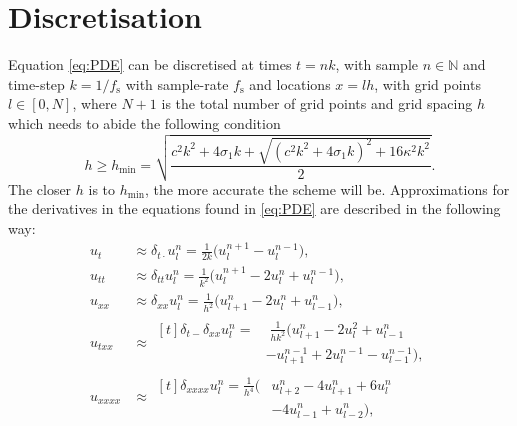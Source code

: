 \documentclass[twoside,a4paper]{article}
\begin{document}
\section{Discretisation}\label{sec:discretisation}
Equation \eqref{eq:PDE} can be discretised at times $t = nk$, with sample $n \in \mathbb{N}$ and time-step $k = 1 / f_\text{s}$ with sample-rate $f_\text{s}$ and locations $x = lh$, with grid points $l \in [0,N]$, where $N + 1$ is the total number of grid points and grid spacing $h$ which needs to abide the following condition \cite{Bilbao2009}
\begin{equation}
    h \geq h_\text{min} = \sqrt{\frac{c^2k^2+4 \sigma_1k+\sqrt{(c^2k^2+4\sigma_1k)^2+16\kappa^2k^2}}{2}}.
\end{equation}
The closer $h$ is to $h_\text{min}$, the more accurate the scheme will be. 
Approximations for the derivatives in the equations found in \ref{eq:PDE} are described in the following way: 
\begin{subequations}\label{eq:approximations}
    \begin{align}
        \label{eq:centerTime}
        u_{t} &\approx \delta_{t\cdot} u^n_l = \frac{1}{2k}\big(u_l^{n+1}-u_l^{n-1}\big),\\
        \label{eq:secondTime}
        u_{tt} &\approx \delta_{tt}u_l^n = \frac{1}{k^2} \big(u_l^{n+1} - 2u_l^n + u_l^{n-1}\big),\\
        \label{eq:secondSpacex}
        u_{xx} &\approx \delta_{xx}u_l^n = \frac{1}{h^2}\big(u_{l+1}^n - 2u_l^n + u_{l-1}^n\big),\\
        u_{txx} &\approx 
        \begin{aligned}[t]\delta_{t-}\delta_{xx}u_l^n =& \; \frac{1}{hk^2}\big(u_{l+1}^n - 2u_l^2 + u_{l-1}^n \\
        &- u_{l+1}^{n-1} + 2u_l^{n-1} - u_{l-1}^{n-1}\big),
        \end{aligned}\\
        \label{eq:fourthSpacex}
        u_{xxxx} &\approx\begin{aligned}[t] \delta_{xxxx}u_l^n = \frac{1}{h^4}\big(&u_{l+2}^n - 4u_{l+1}^n + 6u_l^n \\
        &- 4u_{l-1}^n +u_{l-2}^n\big),
        \end{aligned}
    \end{align}
\end{subequations}
\end{document}
